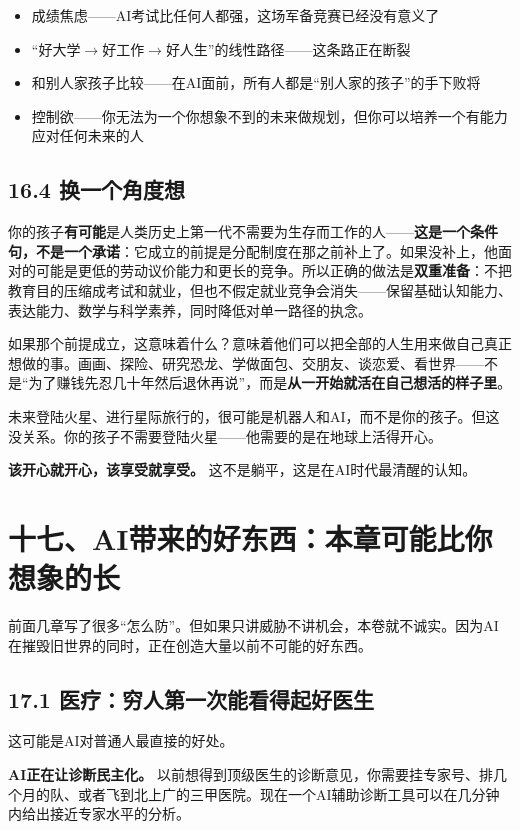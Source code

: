 \documentclass[11pt,a4paper]{ctexart}
\begin{document}
\begin{itemize}
  \item 成绩焦虑——AI考试比任何人都强，这场军备竞赛已经没有意义了
  \item “好大学$\to$好工作$\to$好人生”的线性路径——这条路正在断裂
  \item 和别人家孩子比较——在AI面前，所有人都是“别人家的孩子”的手下败将
  \item 控制欲——你无法为一个你想象不到的未来做规划，但你可以培养一个有能力应对任何未来的人
\end{itemize}

\subsection{16.4 换一个角度想}

你的孩子\textbf{有可能}是人类历史上第一代不需要为生存而工作的人——\textbf{这是一个条件句，不是一个承诺}：它成立的前提是分配制度在那之前补上了。如果没补上，他面对的可能是更低的劳动议价能力和更长的竞争。所以正确的做法是\textbf{双重准备}：不把教育目的压缩成考试和就业，但也不假定就业竞争会消失——保留基础认知能力、表达能力、数学与科学素养，同时降低对单一路径的执念。

如果那个前提成立，这意味着什么？意味着他们可以把全部的人生用来做自己真正想做的事。画画、探险、研究恐龙、学做面包、交朋友、谈恋爱、看世界——不是“为了赚钱先忍几十年然后退休再说”，而是\textbf{从一开始就活在自己想活的样子里}。

未来登陆火星、进行星际旅行的，很可能是机器人和AI，而不是你的孩子。但这没关系。你的孩子不需要登陆火星——他需要的是在地球上活得开心。

\textbf{该开心就开心，该享受就享受。} 这不是躺平，这是在AI时代最清醒的认知。

\section{十七、AI带来的好东西：本章可能比你想象的长}

前面几章写了很多“怎么防”。但如果只讲威胁不讲机会，本卷就不诚实。因为AI在摧毁旧世界的同时，正在创造大量以前不可能的好东西。

\subsection{17.1 医疗：穷人第一次能看得起好医生}

这可能是AI对普通人最直接的好处。

\textbf{AI正在让诊断民主化。} 以前想得到顶级医生的诊断意见，你需要挂专家号、排几个月的队、或者飞到北上广的三甲医院。现在一个AI辅助诊断工具可以在几分钟内给出接近专家水平的分析。
\end{document}
